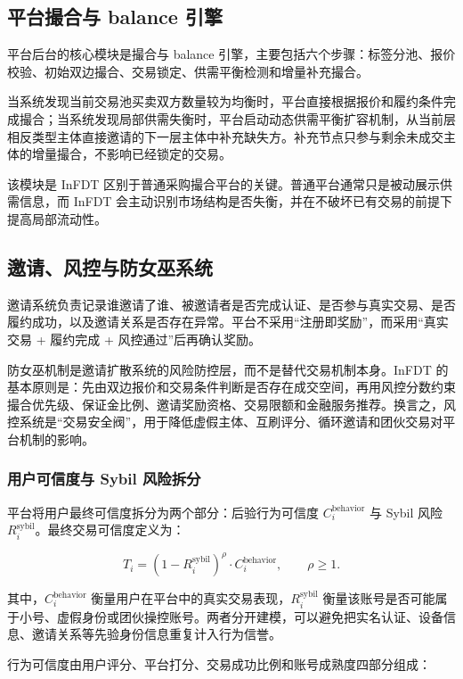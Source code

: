 \documentclass[UTF8,11pt]{ctexart}
\begin{document}
\subsection{平台撮合与 balance 引擎}

平台后台的核心模块是撮合与 balance 引擎，主要包括六个步骤：标签分池、报价校验、初始双边撮合、交易锁定、供需平衡检测和增量补充撮合。

当系统发现当前交易池买卖双方数量较为均衡时，平台直接根据报价和履约条件完成撮合；当系统发现局部供需失衡时，平台启动动态供需平衡扩容机制，从当前层相反类型主体直接邀请的下一层主体中补充缺失方。补充节点只参与剩余未成交主体的增量撮合，不影响已经锁定的交易。

该模块是 InFDT 区别于普通采购撮合平台的关键。普通平台通常只是被动展示供需信息，而 InFDT 会主动识别市场结构是否失衡，并在不破坏已有交易的前提下提高局部流动性。


\subsection{邀请、风控与防女巫系统}

邀请系统负责记录谁邀请了谁、被邀请者是否完成认证、是否参与真实交易、是否履约成功，以及邀请关系是否存在异常。平台不采用“注册即奖励”，而采用“真实交易 + 履约完成 + 风控通过”后再确认奖励。

防女巫机制是邀请扩散系统的风险防控层，而不是替代交易机制本身。InFDT 的基本原则是：先由双边报价和交易条件判断是否存在成交空间，再用风控分数约束撮合优先级、保证金比例、邀请奖励资格、交易限额和金融服务推荐。换言之，风控系统是“交易安全阀”，用于降低虚假主体、互刷评分、循环邀请和团伙交易对平台机制的影响。

\subsubsection*{用户可信度与 Sybil 风险拆分}

平台将用户最终可信度拆分为两个部分：后验行为可信度 $C_i^{\mathrm{behavior}}$ 与 Sybil 风险 $R_i^{\mathrm{sybil}}$。最终交易可信度定义为：

\[
    T_i = \left(1-R_i^{\mathrm{sybil}}\right)^\rho \cdot C_i^{\mathrm{behavior}}, \qquad \rho \geq 1.
\]

其中，$C_i^{\mathrm{behavior}}$ 衡量用户在平台中的真实交易表现，$R_i^{\mathrm{sybil}}$ 衡量该账号是否可能属于小号、虚假身份或团伙操控账号。两者分开建模，可以避免把实名认证、设备信息、邀请关系等先验身份信息重复计入行为信誉。

行为可信度由用户评分、平台打分、交易成功比例和账号成熟度四部分组成：
\end{document}
